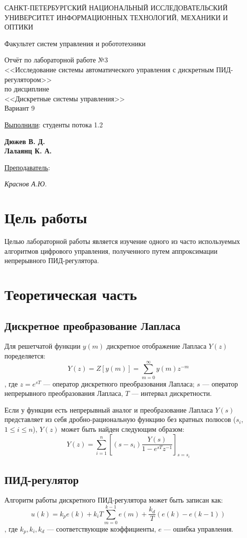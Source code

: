 \documentclass[a4paper, 14pt]{extarticle}
\theoremstyle{definition}
\theoremstyle{plain}
\theoremstyle{remark}
\newcommand*{\titlePage}{
	\thispagestyle{title}
	\begingroup
	\begin{center}
		\vspace*{3ex}
		{\small
			САНКТ-ПЕТЕРБУРГСКИЙ НАЦИОНАЛЬНЫЙ ИССЛЕДОВАТЕЛЬСКИЙ УНИВЕРСИТЕТ ИНФОРМАЦИОННЫХ ТЕХНОЛОГИЙ, МЕХАНИКИ И ОПТИКИ	
		}
		
		\vspace*{2ex}
		
		{\normalsize
			Факультет систем управления и робототехники
		}
		
		\vspace*{15ex}
		
		{
			Отчёт по лабораторной работе №3\\
			<<Исследование системы автоматического управления с дискретным ПИД-регулятором>>\\
			по дисциплине\\
			<<Дискретные системы управления>>\\
				Вариант 9
			
		}
		
	\end{center}
	\vspace*{10ex}
	\begin{flushright}
		{\large 
			\underline{Выполнили}: студенты потока 1.2 \\
			\begin{flushright}
				\textbf{Дюжев В. Д.}\\
				\textbf{Лалаянц К. А.}\\
			\end{flushright}
		}
		\vspace*{5ex}
		{\large 
			\underline{Преподаватель}:\\ 
			\begin{flushright}
            \textit{Краснов А.Ю.}
			\end{flushright}
		}
	\end{flushright}	
	\newpage
	\setcounter{page}{1}
	\endgroup}
\begin{document}
\renewcommand{\contentsname}{\hfillОГЛАВЛЕНИЕ\hfill} 
\titlePage
\thispagestyle{plain}
\tableofcontents
\pagestyle{style}

\newpage
\setcounter{page}{1}

% 

\section{Цель работы}
Целью лабораторной работы является изучение одного из часто используемых алгоритмов 
цифрового управления, полученного путем аппроксимации непрерывного ПИД-регулятора.

\section{Теоретическая часть}

\subsection{Дискретное преобразование Лапласа}
Для решетчатой функции $y(m)$ дискретное отображение Лапласа $Y(z)$ поределяется:
\begin{equation}
	Y(z)=Z[y(m)] = \sum\limits_{m=0}^{\infty}y(m)z^{-m}
\end{equation}
, где $z=e^{sT}$ --- оператор дискретного преобразования Лапласа; $s$ --- оператор непрерывного преобразования Лапласа, $T$ --- интервал дискретности.

Если у функции есть непрерывный аналог и преобразование Лапласа $Y(s)$ представляет из себя дробно-рациональную функцию без кратных полюсов ($s_i$, $1 \le i \le n$), $Y(z)$ может быть найден следующим образом:
\begin{equation}
	Y(z) = \sum\limits_{i=1}^{n}[(s-s_i)\frac{Y(s)}{1-e^{sT}z^{-1}}]_{s=s_i}
\end{equation}
\subsection{ПИД-регулятор}
Алгоритм работы дискретного ПИД-регулятора может быть записан как:
\begin{equation}
	u(k) = k_p e(k) + k_i T \sum_{m=0}^{k-1} e(m) + \frac{k_d}{T} \left( e(k) - e(k - 1) \right)
\end{equation}
, где $k_p, k_i, k_d$ --- соответствующие коэффициенты, $e$ --- ошибка управления.
\end{document}
